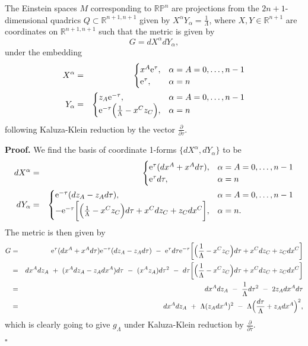 \begin{prop}The Einstein spaces $M$ corresponding to $\mathbb{RP}^{n}$
are projections from the $2n+1$-dimensional quadrics $Q\subset\mathbb{R}^{n+1,n+1}$
given by $X^{\alpha}Y_{\alpha}=\frac{1}{\Lambda}$, where $X,Y\in\mathbb{R}^{n+1}$
are coordinates on $\mathbb{R}^{n+1,n+1}$ such that the metric is
given by 
\[
G={d}X^{\alpha}{d}Y_{\alpha},
\]
 under the embedding
\begin{eqnarray}
X^{\alpha} & = & \begin{cases}
x^{A}\mathrm{e}^{\tau}, & \alpha=A=0,\dots,n-1\\
\mathrm{e}^{\tau}, & \alpha=n
\end{cases}\nonumber \\
Y_{\alpha} & = & \begin{cases}
z_{A}\mathrm{e}^{-\tau}, & \alpha=A=0,\dots,n-1\\
\mathrm{e}^{-\tau}\Bigl(\frac{1}{\Lambda}-x^{C}z_{C}\Bigr), & \alpha=n
\end{cases}\label{eq:embedding-1}
\end{eqnarray}
following Kaluza-Klein reduction by the vector $\frac{\partial}{\partial\tau}.$
\end{prop}
\noindent
\textbf{Proof. }We find the basis of coordinate 1-forms $\{{d}X^{\alpha},{d}Y_{\alpha}\}$
to be
\begin{eqnarray*}
{d}X^{\alpha} & = & \begin{cases}
\mathrm{e}^{\tau}({d}x^{A}+x^{A}{d}\tau), & \alpha=A=0,\dots,n-1\\
\mathrm{e}^{\tau}{d}\tau, & \alpha=n
\end{cases}\\
{d}Y_{\alpha} & = & \begin{cases}
\mathrm{e}^{-\tau}({d}z_{A}-z_{A}{d}\tau), & \alpha=A=0,\dots,n-1\\
-\mathrm{e}^{-\tau}\biggl[\Bigl(\frac{1}{\Lambda}-x^{C}z_{C}\Bigr){d}\tau+x^{C}{d}z_{C}+z_{C}{d}x^{C}\biggr], & \alpha=n.
\end{cases}
\end{eqnarray*}
The metric is then given by
\begin{eqnarray*}
G & = & \mathrm{e}^{\tau}({d}x^{A}+x^{A}{d}\tau)\mathrm{e}^{-\tau}({d}z_{A}-z_{A}{d}\tau)\ -\ \mathrm{e}^{\tau}{d}\tau\mathrm{e}^{-\tau}\biggl[\Bigl(\frac{1}{\Lambda}-x^{C}z_{C}\Bigr){d}\tau+x^{C}{d}z_{C}+z_{C}{d}x^{C}\biggr]\\
 & = & {d}x^{A}{d}z_{A}\ +\ (x^{A}{d}z_{A}-z_{A}{d}x^{A}){d}\tau\ -\ (x^{A}z_{A}){d}\tau^{2}\ -\ {d}\tau\biggl[\Bigl(\frac{1}{\Lambda}-x^{C}z_{C}\Bigr){d}\tau+x^{C}{d}z_{C}+z_{C}{d}x^{C}\biggr]\\
 & = & {d}x^{A}{d}z_{A}\ -\ \frac{1}{\Lambda}{d}\tau^{2}\ -\ 2z_{A}{d}x^{A}{d}\tau\\
 & = & {d}x^{A}{d}z_{A}\ +\ \Lambda(z_{A}{d}x^{A})^{2}\ -\ \Lambda\Bigl(\frac{{d}\tau}{\Lambda}+z_{A}{d}x^{A}\Bigr)^{2},
\end{eqnarray*}
which is clearly going to give $g_{\Lambda}$ under Kaluza-Klein reduction
by $\frac{\partial}{\partial\tau}$.
\begin{flushright}
$\square$
\par\end{flushright}

